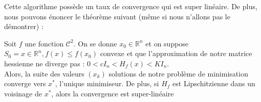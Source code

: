 Cette algorithme possède un taux de convergence qui est super linéaire. De plus, nous pouvons énoncer le théorème suivant (même si nous n'allons pas le démontrer) : 

\begin{theoreme}
		Soit $f$ une fonction $\mathcal{C}^2$. On se donne $x_0 \in \mathbb{R}^n$ et on suppose $S_0 = {x\in \mathbb{R}^n, f(x) \leq f(x_0)}$ convexe et que l'approximation de notre matrice hessienne ne diverge pas : $ 0 < cI_n < H_f(x) < KI_n$.\\
		Alors, la suite des valeurs $(x_k)$ solutions de notre problème de minimisation converge vers $x^*$, l'unique minimiseur. De plus, si $H_f$ est Lipschitzienne dans un voisinage de $x^*$, alors la convergence est super-linéaire
\end{theoreme}

